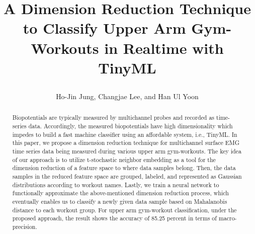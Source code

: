\documentclass{ISIS}
\begin{document}
\title{\begin{center}A Dimension Reduction Technique to Classify Upper Arm Gym-Workouts in Realtime with TinyML\end{center}}
\author{Ho-Jin Jung, Changjae Lee, and Han Ul Yoon}

\begin{abstract}
Biopotentials are typically measured by multichannel probes and recorded as time-series data. Accordingly, the measured biopotentials have high dimensionality which impedes to build a fast machine classifier using an affordable system, i.e., TinyML. In this paper, we propose a dimension reduction technique for multichannel surface EMG time series data being measured during various upper arm gym-workouts. The key idea of our approach is to utilize t-stochastic neighbor embedding as a tool for the dimension reduction of a feature space to where data samples belong. Then, the data samples in the reduced feature space are grouped, labeled, and represented as Gaussian distributions according to workout names. 
%
Lastly, we train a neural network to functionally approximate the above-mentioned dimension reduction process, which eventually enables us to classify a newly given data sample based on Mahalanobis distance to each workout group.
%
For upper arm gym-workout classification, under the proposed approach, the result shows the accuracy of 85.25 percent in terms of macro-precision.       
\end{abstract}
\end{document}
